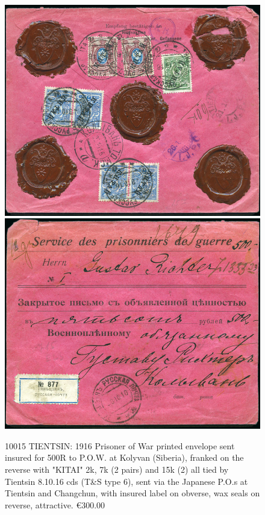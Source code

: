 \begin{figure}[htbp]
\centering
\includegraphics[width=.95\textwidth]{../russian-post-offices-in-china/10015.jpg}
\includegraphics[width=.95\textwidth]{../russian-post-offices-in-china/10015-1.jpg}
\caption{
10015	TIENTSIN: 1916 Prisoner of War printed envelope sent insured for 500R
to P.O.W. at Kolyvan (Siberia), franked on the reverse with "KITAI" 2k, 7k (2 pairs)
and 15k (2) all tied by Tientsin 8.10.16 cds (T\&S type 6), sent via the 
Japanese P.O.s at Tientsin and Changchun, with insured label on obverse, 
wax seals on reverse, attractive.
\euro 300.00
}  
\end{figure}








                                                        